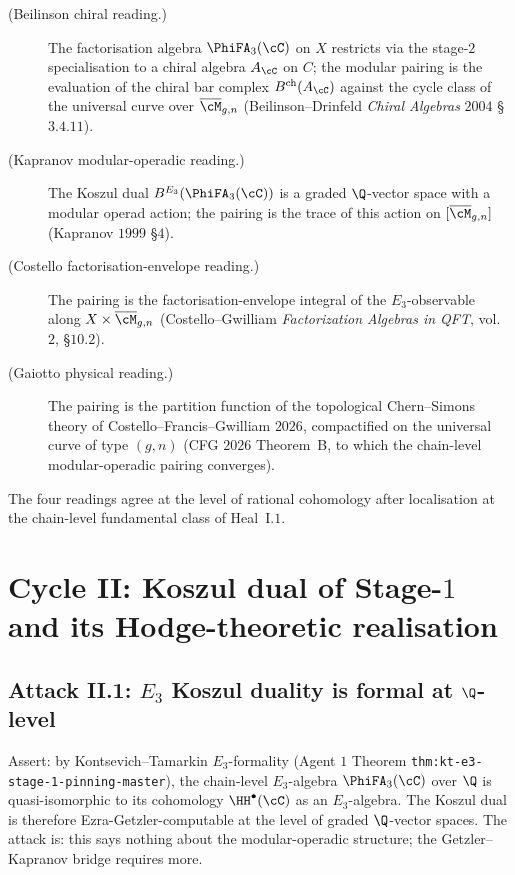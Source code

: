 \begin{description}
\item[(Beilinson chiral reading.)] The factorisation algebra
$\PhiFA_3(\cC)$ on $X$ restricts via the stage-$2$ specialisation to a
chiral algebra $A_\cC$ on $C$; the modular pairing is the evaluation of
the chiral bar complex $B^{\mathrm{ch}}(A_\cC)$ against the cycle class
of the universal curve over $\overline{\cM}_{g, n}$ (Beilinson--Drinfeld
\emph{Chiral Algebras} $2004$ \S$3.4.11$).
\item[(Kapranov modular-operadic reading.)] The Koszul dual
$B^{E_3}(\PhiFA_3(\cC))$ is a graded $\Q$-vector space with a modular
operad action; the pairing is the trace of this action on
$[\overline{\cM}_{g, n}]$ (Kapranov $1999$ \S$4$).
\item[(Costello factorisation-envelope reading.)] The pairing is the
factorisation-envelope integral of the $E_3$-observable along
$X \times \overline{\cM}_{g, n}$ (Costello--Gwilliam \emph{Factorization
Algebras in QFT}, vol.~$2$, \S$10.2$).
\item[(Gaiotto physical reading.)] The pairing is the partition function
of the topological Chern--Simons theory of
Costello--Francis--Gwilliam $2026$, compactified on the universal curve
of type $(g, n)$ (CFG $2026$ Theorem~B, to which the chain-level
modular-operadic pairing converges).
\end{description}

The four readings agree at the level of rational cohomology after
localisation at the chain-level fundamental class of Heal~I.$1$.


\section{Cycle II: Koszul dual of Stage-$1$ and its Hodge-theoretic
realisation}
\label{sec:cycle-2-koszul-dual-stage-1}

\subsection*{Attack II.1: $E_3$ Koszul duality is formal at $\Q$-level}

Assert: by Kontsevich--Tamarkin $E_3$-formality (Agent $1$ Theorem
\texttt{thm:kt-e3-stage-1-pinning-master}), the chain-level $E_3$-algebra
$\PhiFA_3(\cC)$ over $\Q$ is quasi-isomorphic to its cohomology
$\HH^\bullet(\cC)$ as an $E_3$-algebra. The Koszul dual is therefore
Ezra-Getzler-computable at the level of graded $\Q$-vector spaces. The
attack is: this says nothing about the modular-operadic structure; the
Getzler--Kapranov bridge requires more.

